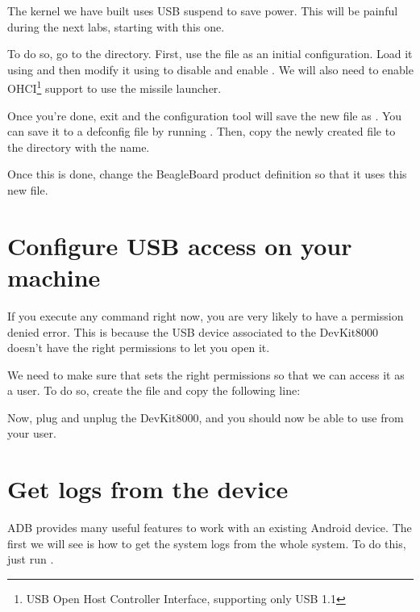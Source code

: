 The kernel we have built uses USB suspend to save power. This will
be painful during the next labs, starting with this one.

To do so, go to the  directory. First, use the
 file as an initial configuration. Load it using
 and then modify it using
 to disable 
and enable . We will also need to enable
OHCI\footnote{USB Open Host Controller Interface, supporting only USB 1.1}
support to use the missile launcher.

Once you're done, exit and the configuration tool will save the new
file as . You can save it to a defconfig file by
running . Then, copy the newly created
 file to the  directory with
the  name.

Once this is done, change the BeagleBoard product definition so that
it uses this new file.

\section{Configure USB access on your machine}

If you execute any command right now, you are very likely to have a
permission denied error. This is because the USB device associated to
the DevKit8000 doesn't have the right permissions to let you open it.

We need to make sure that  sets the right permissions so that we can access
it as a user. To do so, create the file
 and copy the following line:


Now, plug and unplug the DevKit8000, and you should now be able to use
 from your user.

\section{Get logs from the device}

ADB provides many useful features to work with an existing Android device.
The first we will see is how to get the system logs from the whole system. To do
this, just run .

